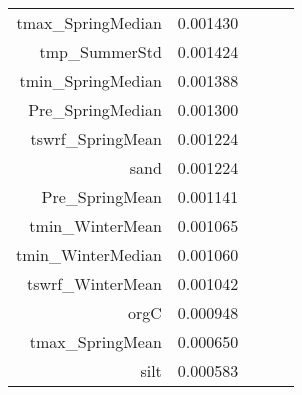 \begin{tabular}{rrrrr}
tmax_SpringMedian & 0.001430 \\
tmp_SummerStd & 0.001424 \\
tmin_SpringMedian & 0.001388 \\
Pre_SpringMedian & 0.001300 \\
tswrf_SpringMean & 0.001224 \\
sand & 0.001224 \\
Pre_SpringMean & 0.001141 \\
tmin_WinterMean & 0.001065 \\
tmin_WinterMedian & 0.001060 \\
tswrf_WinterMean & 0.001042 \\
orgC & 0.000948 \\
tmax_SpringMean & 0.000650 \\
silt & 0.000583 \\
\bottomrule
\end{tabular}
